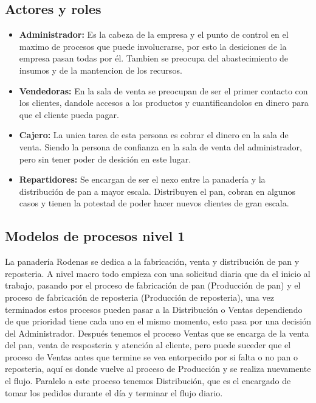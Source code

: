 \subsection{Actores y roles}
\begin{itemize}
\item \textbf{Administrador:} Es la cabeza de la empresa y el punto de control en el maximo de procesos que puede involucrarse, por esto la desiciones de la empresa pasan todas por él. Tambien se preocupa del abastecimiento de insumos y de la mantencion de los recursos. 

\item \textbf{Vendedoras:} En la sala de venta se preocupan de ser el primer contacto con los clientes, dandole accesos a los productos y cuantificandolos en dinero para que el cliente pueda pagar.

\item \textbf{Cajero:} La unica tarea de esta persona es cobrar el dinero en la sala  de venta. Siendo  la persona de confianza en la sala de venta del administrador, pero sin tener poder de desición en este lugar.

\item \textbf{Repartidores:} Se encargan de ser el nexo entre la panadería y la distribución de pan a mayor escala. Distribuyen el pan, cobran en algunos casos y tienen la potestad de poder hacer nuevos clientes de gran escala.
\end{itemize}

\subsection{Modelos de procesos nivel 1}
La panadería Rodenas se dedica a la fabricación, venta y distribución de pan y reposteria. A nivel macro todo empieza con una solicitud diaria que da el inicio al trabajo, pasando por el proceso de fabricación de pan (Producción de pan) y el proceso de fabricación de reposteria (Producción de reposteria), una vez terminados estos procesos pueden pasar a la Distribución o Ventas dependiendo de que prioridad tiene cada uno en el mismo momento, esto pasa por una decisión del Administrador. Después tenemos el proceso Ventas que se encarga de la venta del pan, venta de resposteria y atención al cliente, pero puede suceder que el proceso de Ventas antes que termine se vea entorpecido por si falta o no pan o reposteria, aquí es donde vuelve al proceso de Producción y se realiza nuevamente el flujo. Paralelo a este proceso tenemos Distribución, que es el encargado de tomar los pedidos durante el día y terminar el flujo diario.

